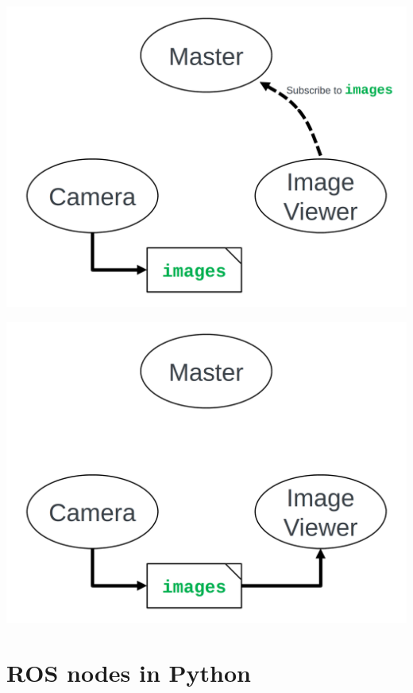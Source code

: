 \documentclass{beamer}
\begin{document}
        \begin{frame}[plain]{}
            \centering
            \includegraphics[width =1.0\linewidth]{figures/master3.png}                                                              
        \end{frame} 
        \begin{frame}[plain]{}
            \centering
            \includegraphics[width =1.0\linewidth]{figures/master4.png}                                                              
        \end{frame}
        
        

        
\section{ROS nodes in Python}
\end{document}
